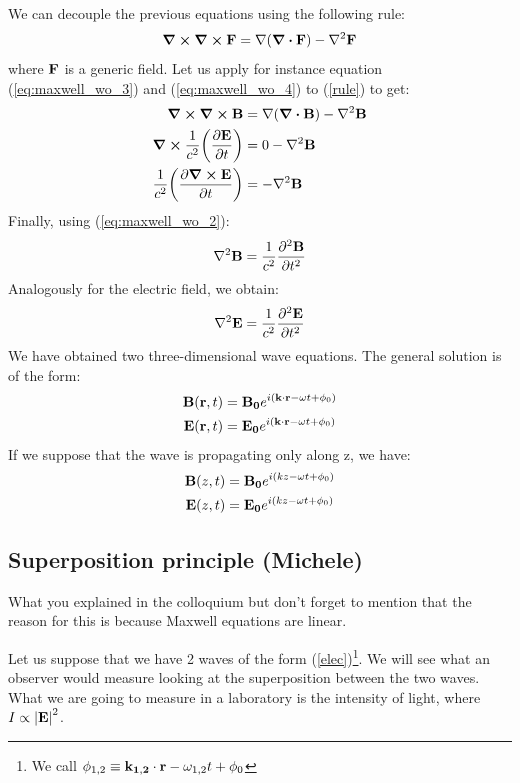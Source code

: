 \documentclass[11pt,a4paper]{article}
\begin{document}
We can decouple the previous equations using the following rule:
\begin{equation}
\curl \curl \vb{F}=\nabla (\div \vb{F})- \nabla^2\vb{F}\label{rule}
\end{equation}
where $\vb{F}$ is a generic field. Let us apply for instance equation (\ref{eq:maxwell_wo_3}) and (\ref{eq:maxwell_wo_4}) to (\ref{rule}) to get:
\begin{align*}
\curl \curl \vb{B} &=\nabla (\div \vb{B})- \nabla^2\vb{B} \\
\curl \frac{1}{c^2}\qty(\pdv{\vb{E}}{t}) &=0-\nabla^2\vb{B} \\
\frac{1}{c^2}\qty(\pdv{\curl \vb{E}}{t}) &=-\nabla^2\vb{B}
\end{align*}
Finally, using (\ref{eq:maxwell_wo_2}):
\begin{equation}
\nabla^2\vb{B}=\frac{1}{c^2}\pdv{^2 \vb{B}}{t^2}
\end{equation}
Analogously for the electric field, we obtain:
\begin{equation}
\nabla^2\vb{E}=\frac{1}{c^2}\pdv{^2 \vb{E}}{t^2}
\end{equation}
We have obtained two three-dimensional wave equations. The general solution is of the form:
\begin{align}
\vb{B}(\vb{r},t) &=\vb{B_0}e^{i(\vb{k} \cdot \vb{r}-\omega t+\phi_0)}\\
\vb{E}(\vb{r},t) &=\vb{E_0}e^{i(\vb{k} \cdot \vb{r}-\omega t+\phi_0)}\label{elec}
\end{align}
If we suppose that the wave is propagating only along z, we have:
\begin{align}
\vb{B}(z,t) &=\vb{B_0}e^{i(kz-\omega t+\phi_0)}\\
\vb{E}(z,t) &=\vb{E_0}e^{i(kz-\omega t+\phi_0)}
\end{align}

\subsection{Superposition principle (Michele)}
What you explained in the colloquium but don't forget to mention that the reason for this is because Maxwell equations are linear.

Let us suppose that we have 2 waves of the form (\ref{elec})\footnote{We call $\phi_{1,2}\equiv\vb{k_{1,2}} \cdot \vb{r}-\omega_{1,2} t+\phi_0$}. We will see what an observer would measure looking at the superposition between the two waves. What we are going to measure in a laboratory is the intensity of light, where $I\propto \abs{\vb{E}}^2$.
\end{document}
